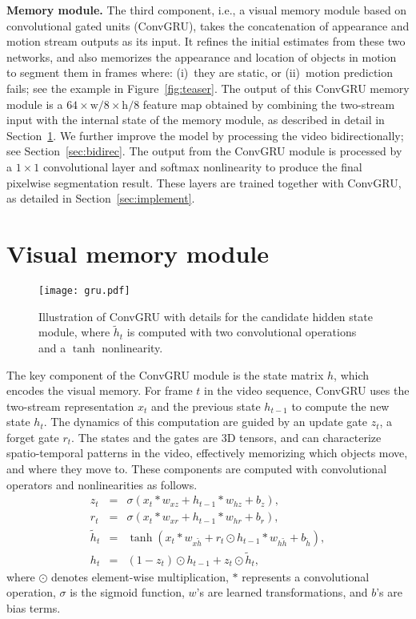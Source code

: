 \documentclass[10pt,twocolumn,letterpaper]{article}
\begin{document}
\noindent \textbf{Memory module.}
The third component, i.e., a visual memory module based on convolutional gated
units (ConvGRU), takes the concatenation of appearance and motion stream
outputs as its input. It refines the initial estimates from these two networks,
and also memorizes the appearance and location of objects in motion to segment
them in frames where: (i)~they are static, or (ii)~motion prediction fails; see
the example in Figure~\ref{fig:teaser}. The output of this ConvGRU memory
module is a $64 \times \text{w}/8 \times \text{h}/8$ feature map obtained by
combining the two-stream input with the internal state of the memory module, as
described in detail in Section~\ref{sec:recurrent}. We further improve the
model by processing the video bidirectionally; see Section~\ref{sec:bidirec}.
The output from the ConvGRU module is processed by a $1 \times 1$ convolutional
layer and softmax nonlinearity to produce the final pixelwise segmentation
result. These layers are trained together with ConvGRU, as detailed in
Section~\ref{sec:implement}.

\section{Visual memory module}
\label{sec:recurrent}
\begin{figure}[t]
\begin{center}
\texttt{[image: gru.pdf]}
\end{center}
\vspace{-0.3cm}
\caption{Illustration of ConvGRU with details for the candidate hidden state
module, where  $\tilde{h}_t$ is computed with two convolutional operations and
a $\tanh$ nonlinearity.}
\vspace{-0.3cm}
\label{fig:lstm}
\end{figure}

The key component of the ConvGRU module is the state matrix $h$, which encodes
the visual memory. For frame $t$ in the video sequence, ConvGRU uses the
two-stream representation $x_t$ and the previous state $h_{t-1}$ to compute the
new state $h_t$. The dynamics of this computation are guided by an update gate
$z_t$, a forget gate $r_t$. The states and the gates are 3D tensors, and can
characterize spatio-temporal patterns in the video, effectively memorizing
which objects move, and where they move to. These components are computed with
convolutional operators and nonlinearities as follows.
\begin{eqnarray}
	z_t &=& \sigma(x_t * w_{xz} + h_{t-1} * w_{hz} + b_{z}), \label{eqn:update} \\
	r_t &=& \sigma(x_t * w_{xr} + h_{t-1} * w_{hr} + b_{r}), \label{eqn:reset} \\
	\tilde{h}_t &=& \tanh(x_t * w_{x\tilde{h}} + r_t \odot h_{t-1} * w_{h\tilde{h}} + b_{\tilde{h}}), \label{eqn:candmem} \\
	h_t &=& (1 - z_t) \odot h_{t-1}  + z_t \odot \tilde{h}_t, \label{eqn:state}
\end{eqnarray}
where $\odot$ denotes element-wise multiplication, $*$ represents a
convolutional operation, $\sigma$ is the sigmoid function, $w$'s are learned
transformations, and $b$'s are bias terms.
\end{document}
